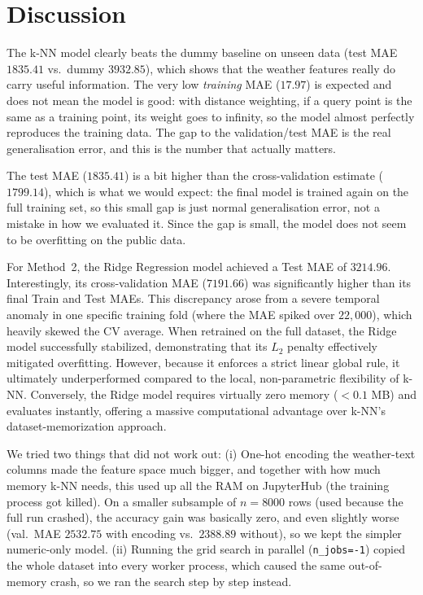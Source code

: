\documentclass[a4, 10 pt, conference]{ieeeconf}  %
\begin{document}
\section{Discussion}
\label{sec:discuss}

The k-NN model clearly beats the dummy baseline on unseen data (test MAE
$1835.41$ vs.\ dummy $3932.85$), which shows that the weather features really
do carry useful information. The very low \emph{training} MAE ($17.97$) is
expected and does not mean the model is good: with distance weighting, if a
query point is the same as a training point, its weight goes to infinity, so
the model almost perfectly reproduces the training data. The gap to the
validation/test MAE is the real generalisation error, and this is the number
that actually matters.

The test MAE ($1835.41$) is a bit higher than the cross-validation estimate
($1799.14$), which is what we would expect: the final model is trained again
on the full training set, so this small gap is just normal generalisation
error, not a mistake in how we evaluated it. Since the gap is small, the
model does not seem to be overfitting on the public data.

For Method~2, the Ridge Regression model achieved a Test MAE of $3214.96$. Interestingly, its cross-validation MAE ($7191.66$) was significantly higher than its final Train and Test MAEs. This discrepancy arose from a severe temporal anomaly in one specific training fold (where the MAE spiked over $22{,}000$), which heavily skewed the CV average. When retrained on the full dataset, the Ridge model successfully stabilized, demonstrating that its $L_2$ penalty effectively mitigated overfitting. However, because it enforces a strict linear global rule, it ultimately underperformed compared to the local, non-parametric flexibility of k-NN. Conversely, the Ridge model requires virtually zero memory ($< 0.1$ MB) and evaluates instantly, offering a massive computational advantage over k-NN's dataset-memorization approach.

We tried two things that did not work out: (i) One-hot encoding the
weather-text columns made the feature space much bigger, and together with
how much memory k-NN needs, this used up all the RAM on JupyterHub (the
training process got killed). On a smaller subsample of $n{=}8000$ rows (used
because the full run crashed), the accuracy gain was basically zero, and even
slightly worse (val.\ MAE $2532.75$ with encoding vs.\ $2388.89$ without), so
we kept the simpler numeric-only model. (ii) Running the grid search in
parallel (\texttt{n\_jobs=-1}) copied the whole dataset into every worker
process, which caused the same out-of-memory crash, so we ran the search
step by step instead.
\end{document}
